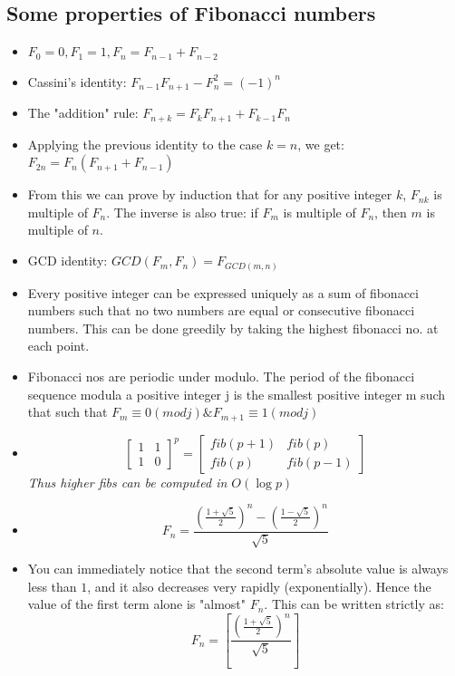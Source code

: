 \documentclass[8pt, a4paper, oneside, twocolumn]{extarticle}
\begin{document}
\subsection{Some properties of Fibonacci numbers}
\begin{itemize}
    \item $F_0 = 0, F_1 = 1, F_n = F_{n-1} + F_{n-2}$
    \item Cassini's identity: $F_{n-1} F_{n+1} - F_n^2 = (-1)^n$
    \item The "addition" rule: $F_{n+k} = F_k F_{n+1} + F_{k-1} F_n$
    \item Applying the previous identity to the case $k = n$, we get: $F_{2n} = F_n (F_{n+1} + F_{n-1})$
    \item From this we can prove by induction that for any positive integer $k$, $F_{nk}$ is multiple of $F_n$.
    The inverse is also true: if $F_m$ is multiple of $F_n$, then $m$ is multiple of $n$.
    \item GCD identity: $GCD(F_m, F_n) = F_{GCD(m, n)}$
    \item Every positive integer can be expressed uniquely as a sum of fibonacci numbers such that no two numbers are equal or consecutive fibonacci numbers. This can be done greedily by taking the highest fibonacci no. at each point.
    \item Fibonacci nos are periodic under modulo. The period of the fibonacci sequence modula a positive integer j is the smallest positive integer m such that such that $F_m \equiv 0 (mod j) \& F_{m + 1} \equiv 1 (mod j)$
    \item \[\begin{bmatrix}
    1 & 1\\
    1 & 0
    \end{bmatrix}^{\!p}
=
\begin{bmatrix}
    fib(p + 1) & fib (p)\\
    fib (p) & fib (p - 1)
    \end{bmatrix}
    \]
    \textit{Thus higher fibs can be computed in $O(\log{p})$}
    \item $$F_n = \frac{\left(\frac{1 + \sqrt{5}}{2}\right)^n - \left(\frac{1 - \sqrt{5}}{2}\right)^n}{\sqrt{5}}$$
    \item You can immediately notice that the second term's absolute value is always less than $1$, and it also decreases very rapidly (exponentially). Hence the value of the first term alone is "almost" $F_n$. This can be written strictly as:
    $$F_n = \left[\frac{\left(\frac{1 + \sqrt{5}}{2}\right)^n}{\sqrt{5}}\right]$$
\end{itemize}
\end{document}

